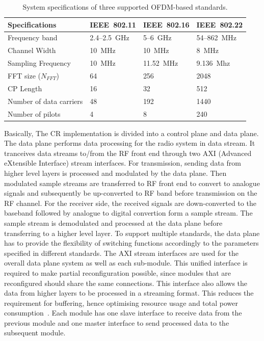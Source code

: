 \begin{table}[h]
\label{Tab:spec}
\centering
\caption{System specifications of three supported OFDM-based standards.}{
\renewcommand{\arraystretch}{1.3}
\begin{tabular}{@{}llll@{}}
\toprule
Specifications 			& IEEE~802.11 				& IEEE~802.16				& IEEE~802.22 		\\ \midrule
Frequency band			& 2.4--2.5~GHz				& 5--6~GHz					& 54--862~MHz		\\
Channel Width			& 10~MHz					& 10~MHz					& 8~MHz			\\
Sampling Frequency		& 10~MHz					& 11.52~MHz				& 9.136~Mhz		\\
FFT size ($N_{FFT}$)		& 64						& 256						& 2048			\\
CP Length				& 16						& 32						& 512				\\
Number of data carriers		& 48						& 192						& 1440			\\
Number of pilots			& 4						& 8						& 240				\\ 
\end{tabular}
}
\end{table}

Basically, The CR implementation is divided into a control plane and data plane. 
The data plane performs data processing for the radio system in data stream. 
It tranceives data streams to/from the RF front end through two AXI (Advanced eXtensible Interface) stream interfaces.
For transmission, sending data from higher level layers is processed and modulated by the data plane.
Then modulated sample streams are transferred to RF front end to convert to analogue signals and subsequently be up-converted to RF band before transmission on the RF channel.
For the receiver side, the received signals are down-converted to the baseband followed by analogue to digital convertion form a sample stream.
The sample stream is demodulated and processed at the data plane before transferring to a higher level layer.
To support multiple standards, the data plane has to provide the flexibility of switching functions accordingly to the parameters specified in different standards.
The AXI stream interfaces are used for the overall data plane system as well as each sub-module.
This unified interface is required to make partial reconfiguration possible, since modules that are reconfigured should share the same connections.
This interface also allows the data from higher layers to be processed in a streaming format. 
This reduces the requirement for buffering, hence optimising resource usage and total power consumption~\cite{Liu2009}. 
Each module has one slave interface to receive data from the previous module and one master interface to send processed data to the subsequent module.

